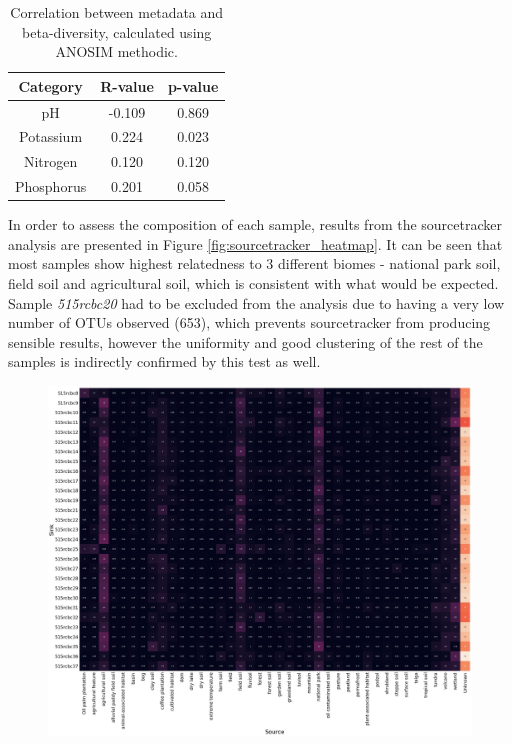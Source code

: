 \documentclass{article}
\begin{document}
\begin{multicols}{2}
\begin{table}[H]
	\begin{center}
		\label{tab:table_correlation}
		\begin{tabular}{c|c|c}
			\textbf{Category} & \textbf{R-value} & \textbf{p-value}\\
			\hline
			pH & -0.109 & 0.869\\
			Potassium & 0.224 & 0.023\\
			Nitrogen & 0.120 & 0.120 \\
			Phosphorus & 0.201 & 0.058\\
		\end{tabular}
		\caption{Correlation between metadata and beta-diversity, calculated using ANOSIM\cite{CLARKE1993} methodic.}
	\end{center}
\end{table}
\par
In order to assess the composition of each sample, results from the sourcetracker analysis are presented in Figure \ref{fig:sourcetracker_heatmap}. It can be seen that most samples show highest relatedness to 3 different biomes - national park soil, field soil and agricultural soil, which is consistent with what would be expected. Sample \textit{515rcbc20} had to be excluded from the analysis due to having a very low number of OTUs observed (653), which prevents sourcetracker from producing sensible results, however the uniformity and good clustering of the rest of the samples is indirectly confirmed by this test as well.
\begin{figure}[H]
	\includegraphics[width=\linewidth]{../sourcetracker/heatmap_perc.png}

\end{figure}
\end{multicols}
\end{document}
